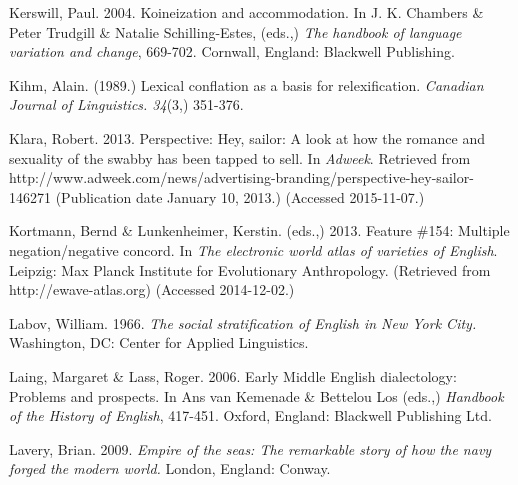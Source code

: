 \begin{styleStandard}
Kerswill, Paul. 2004. Koineization and accommodation. In J. K. Chambers \& Peter Trudgill \& Natalie Schilling-Estes, (eds.,) \textit{The handbook of language variation and change}, 669-702. Cornwall, England: Blackwell Publishing.
\end{styleStandard}

\begin{styleStandard}
Kihm, Alain. (1989.) Lexical conflation as a basis for relexification. \textit{Canadian Journal of Linguistics. 34}(3,) 351-376.
\end{styleStandard}

\begin{styleStandard}
Klara, Robert. 2013. Perspective: Hey, sailor: A look at how the romance and sexuality of the swabby has been tapped to sell. In \textit{Adweek}. Retrieved from http://www.adweek.com/news/advertising-branding/perspective-hey-sailor-146271 (Publication date January 10, 2013.) (Accessed 2015-11-07.)
\end{styleStandard}

\begin{styleStandard}
Kortmann, Bernd \& Lunkenheimer, Kerstin. (eds.,) 2013. Feature \#154: Multiple negation/negative concord. In \textit{The electronic world atlas of varieties of English}. Leipzig: Max Planck Institute for Evolutionary Anthropology. (Retrieved from http://ewave-atlas.org) (Accessed 2014-12-02.)
\end{styleStandard}

\begin{styleStandard}
Labov, William. 1966. \textit{The social stratification of English in New York City. }Washington, DC: Center for Applied Linguistics.
\end{styleStandard}

\begin{styleStandard}
Laing, Margaret \& Lass, Roger. 2006. Early Middle English dialectology: Problems and prospects. In Ans van Kemenade \& Bettelou Los (eds.,) \textit{Handbook of the History of English}, 417-451. Oxford, England: Blackwell Publishing Ltd.
\end{styleStandard}

\begin{styleStandard}
Lavery, Brian. 2009. \textit{Empire of the seas: The remarkable story of how the navy forged the modern world. }London, England: Conway. \ 
\end{styleStandard}

